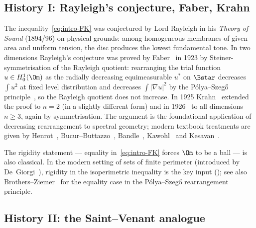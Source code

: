 \subsection{History I: Rayleigh's conjecture, Faber, Krahn}
\label{ssec:intro-history-fk}

The inequality~\eqref{eq:intro-FK} was conjectured by Lord Rayleigh in
his \emph{Theory of Sound} (1894/96) on physical grounds: among
homogeneous membranes of given area and uniform tension, the disc
produces the lowest fundamental tone. In two dimensions Rayleigh's
conjecture was proved by Faber~\cite{Faber1923} in 1923 by
Steiner-symmetrisation of the Rayleigh quotient: rearranging the trial
function $u\in H^1_0(\Om)$ as the radially decreasing equimeasurable
$u^*$ on $\Bstar$ decreases $\int u^2$ at fixed level distribution and
decreases $\int|\nabla u|^2$ by the Pólya--Szeg\H o
principle~\cite{PolyaSzego1951}, so the Rayleigh quotient does not
increase. In 1925 Krahn~\cite{Krahn1925} extended the proof to $n=2$
(in a slightly different form) and in 1926~\cite{Krahn1926} to all
dimensions $n\ge 3$, again by symmetrisation. The argument is the
foundational application of decreasing rearrangement to spectral
geometry; modern textbook treatments are given by
Henrot~\cite{HenrotBook}, Bucur--Buttazzo~\cite{BucurButtazzo},
Bandle~\cite{Bandle1980}, Kawohl~\cite{KawohlBook} and
Kesavan~\cite{Kesavan2006}.

The rigidity statement --- equality in~\eqref{eq:intro-FK} forces $\Om$
to be a ball --- is also classical. In the modern setting of sets of
finite perimeter (introduced by De~Giorgi~\cite{DeGiorgi1958}), rigidity
in the isoperimetric inequality is the key input
(\cite[Chapter~19]{Maggi2012}); see also
Brothers--Ziemer~\cite{BrothersZiemer1988} for the equality case in the
Pólya--Szeg\H o rearrangement principle.

\subsection{History II: the Saint--Venant analogue}
\label{ssec:intro-history-sv}

